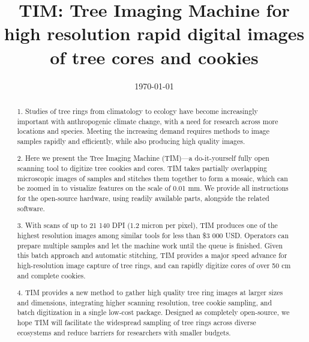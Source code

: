 \documentclass[a4paper,12pt]{article}
\title{TIM: Tree Imaging Machine for high resolution rapid digital images of tree cores and cookies}
\date{\today}
\begin{document}
\linenumbers
\doublespacing
\maketitle

\begin{abstract}  

1.  Studies of tree rings from climatology to ecology have become increasingly important with anthropogenic climate change, with a need for research across more locations and species. Meeting the increasing demand requires methods to image samples rapidly and efficiently, while also producing high quality images. %

2.  Here we present the Tree Imaging Machine (TIM)---a do-it-yourself fully open scanning tool to digitize tree cookies and cores. TIM takes partially overlapping microscopic images of samples and stitches them together to form a mosaic, which can be zoomed in to visualize features on the scale of 0.01 mm. 
We provide all instructions for the open-source hardware, using readily available parts, alongside the related software. %

3. With scans of up to 21 140 DPI (1.2 micron per pixel), TIM produces one of the highest resolution images among similar tools for less than \$3 000 USD. Operators can prepare multiple samples and let the machine work until the queue is finished. Given this batch approach and automatic stitching, TIM provides a major speed advance for high-resolution image capture of tree rings, and can rapidly digitize cores of over 50 cm and complete cookies. %

4. TIM provides a new method to gather high quality tree ring images at larger sizes and dimensions, integrating higher scanning resolution, tree cookie sampling, and batch digitization in a single low-cost package. 
Designed as completely open-source, we hope TIM will facilitate the widespread sampling of tree rings across diverse ecosystems and reduce barriers for researchers with smaller budgets. 

\end{abstract}
\end{document}
